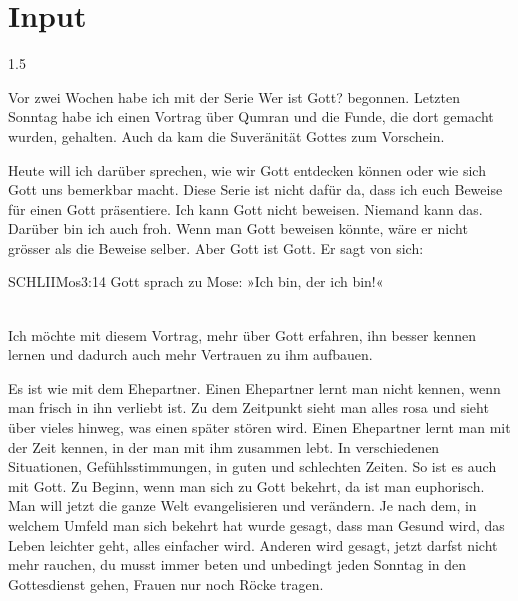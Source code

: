 \documentclass[fontsize=14pt]{../../inc/mybib}
\begin{document}
\section{ Input }
\begin{spacing}{1.5}
    \begin{block} 
        Vor zwei Wochen habe ich mit der Serie \flqq Wer ist Gott?\frqq{} begonnen. Letzten Sonntag habe ich einen Vortrag über Qumran und die Funde, die dort gemacht wurden, gehalten. Auch da kam die Suveränität Gottes zum Vorschein.

        Heute will ich darüber sprechen, wie wir Gott entdecken können oder wie sich Gott uns bemerkbar macht. Diese Serie ist nicht dafür da, dass ich euch Beweise für einen Gott präsentiere. Ich kann Gott nicht beweisen. Niemand kann das. Darüber bin ich auch froh. Wenn man Gott beweisen könnte, wäre er nicht grösser als die Beweise selber. Aber Gott ist Gott. Er sagt von sich:
        \begin{bibelbox}{SCHL}{IIMos}{3:14}
            Gott sprach zu Mose: »Ich bin, der ich bin!«
        \end{bibelbox}
        \\

        Ich möchte mit diesem Vortrag, mehr über Gott erfahren, ihn besser kennen lernen und dadurch auch mehr Vertrauen zu ihm aufbauen. 
        
        Es ist wie mit dem Ehepartner. Einen Ehepartner lernt man nicht kennen, wenn man frisch in ihn verliebt ist. Zu dem Zeitpunkt sieht man alles rosa und sieht über vieles hinweg, was einen später stören wird. Einen Ehepartner lernt man mit der Zeit kennen, in der man mit ihm zusammen lebt. In verschiedenen Situationen, Gefühlsstimmungen, in guten und schlechten Zeiten. So ist es auch mit Gott. Zu Beginn, wenn man sich zu Gott bekehrt, da ist man euphorisch. Man will jetzt die ganze Welt evangelisieren und verändern. Je nach dem, in welchem Umfeld man sich bekehrt hat wurde gesagt, dass man Gesund wird, das Leben leichter geht, alles einfacher wird. Anderen wird gesagt, jetzt darfst nicht mehr rauchen, du musst immer beten und unbedingt jeden Sonntag in den Gottesdienst gehen, Frauen nur noch Röcke tragen.        


\end{block}
\end{spacing}
\end{document}
